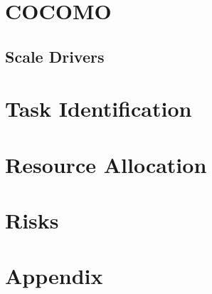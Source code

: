 \documentclass[12pt, a4paper]{article}
\begin{document}
    \newpage
    \section{COCOMO}
        
        
        \subsection{Scale Drivers}
        
    
    \newpage
    \section{Task Identification}
        

    \newpage
    \section{Resource Allocation}
        

    \newpage
    \section{Risks}
        
    
    \newpage
    \section*{Appendix}
    	
\end{document}
